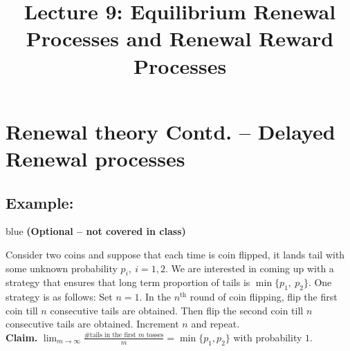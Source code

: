 \documentclass[a4paper,10pt,english]{article}
\title{Lecture 9: Equilibrium Renewal Processes and Renewal Reward Processes}
\author{}
\begin{document}
\maketitle
\section{Renewal theory Contd. -- Delayed Renewal processes }

\subsection{Example:}

\begin{color}{blue} {\bf (Optional -- not covered in class)} \end{color}

Consider two coins and suppose  that each time is coin flipped, it lands tail with some unknown probability $p_i,~i=1,2.$ We are interested in coming up with a strategy that ensures that long term proportion of tails is $\min\{p_1,~p_2\}.$ One strategy is as follows: Set $n = 1$. In the $n^\text{th}$ round of coin flipping, flip the first coin till $n$ consecutive tails are obtained. Then flip the second coin till $n$ consecutive tails are obtained. Increment $n$ and repeat. \\

{\bf Claim.} $\lim_{m \to \infty} \frac{\# \mbox{tails in the first
    $m$ tosses}}{m} = \min\{p_1, p_2\}$ with probability $1$.\\
\end{document}

